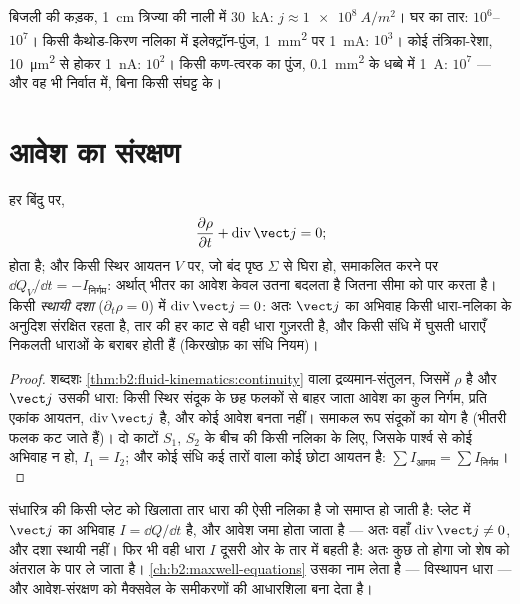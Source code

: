 \begin{example}[परिमाण की कोटियाँ]\label{ex:b2:charges-currents-conduction:orders}
बिजली की कड़क, \qty{1}{cm} त्रिज्या की नाली में \qty{30}{kA}: $j \approx \qty{1e8}{A/m^2}$।
घर का तार: $10^6$--$10^7$। किसी कैथोड-किरण नलिका में इलेक्ट्रॉन-पुंज,
\qty{1}{mm^2} पर \qty{1}{mA}: $10^3$। कोई तंत्रिका-रेशा, \qty{10}{\micro m^2} से होकर
\qty{1}{nA}: $10^2$। किसी कण-त्वरक का पुंज, \qty{0.1}{mm^2} के धब्बे में
\qty{1}{A}: $10^7$ --- और वह भी निर्वात में, बिना किसी संघट्ट के।
\end{example}

\section{आवेश का संरक्षण}

\begin{theorem}[आवेश का स्थानिक संरक्षण]\label{thm:b2:charges-currents-conduction:conservation}
हर बिंदु पर,
\[
\frac{\partial\rho}{\partial t} + \operatorname{div}\vect j = 0 ;
\]
होता है; और किसी स्थिर आयतन $V$ पर, जो बंद पृष्ठ $\Sigma$ से घिरा हो, समाकलित करने पर
$\dd Q_V/\dd t = -I_{\text{निर्गम}}$: अर्थात् भीतर का आवेश केवल उतना बदलता है जितना
सीमा को पार करता है। किसी \emph{स्थायी दशा} ($\partial_t\rho = 0$) में
$\operatorname{div}\vect j = 0$: अतः $\vect j$ का अभिवाह किसी धारा-नलिका के अनुदिश
संरक्षित रहता है, तार की हर काट से वही धारा गुज़रती है, और
किसी संधि में घुसती धाराएँ निकलती धाराओं के बराबर होती हैं (किरखोफ़ का संधि नियम)।
\end{theorem}

\begin{proof}
शब्दशः \cref{thm:b2:fluid-kinematics:continuity} वाला द्रव्यमान-संतुलन,
जिसमें $\rho$  है और $\vect j$ उसकी धारा: किसी स्थिर संदूक के छह
फलकों से बाहर जाता आवेश का कुल निर्गम, प्रति एकांक आयतन,
$\operatorname{div}\vect j$ है, और कोई आवेश बनता नहीं। समाकल रूप
संदूकों का योग है (भीतरी फलक कट जाते हैं)। दो काटों
$S_1$, $S_2$ के बीच की किसी नलिका के लिए, जिसके पार्श्व से कोई अभिवाह न हो, $I_1 = I_2$; और कोई संधि
कई तारों वाला कोई छोटा आयतन है: $\sum I_{\text{आगम}} = \sum I_{\text{निर्गम}}$।
\end{proof}

\begin{remark}[धारा कहाँ रुकती है: संधारित्र]\label{rem:b2:charges-currents-conduction:capacitor}
संधारित्र की किसी प्लेट को खिलाता तार धारा की ऐसी नलिका है जो समाप्त हो
जाती है: प्लेट में $\vect j$ का अभिवाह $I = \dd Q/\dd t$ है, और आवेश जमा होता जाता है
--- अतः वहाँ $\operatorname{div}\vect j \ne 0$, और दशा स्थायी नहीं।
फिर भी वही धारा $I$ दूसरी ओर के तार में बहती है: अतः कुछ तो होगा
जो शेष को अंतराल के पार ले जाता है। \cref{ch:b2:maxwell-equations}
उसका नाम लेता है --- विस्थापन धारा --- और आवेश-संरक्षण को
मैक्सवेल के समीकरणों की आधारशिला बना देता है।
\end{remark}

